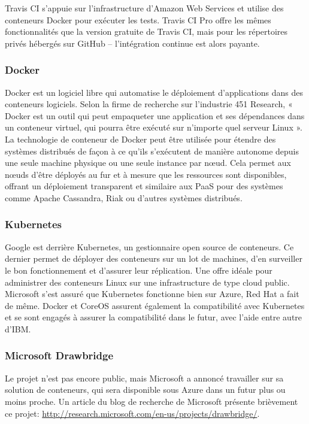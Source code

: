     Travis CI s'appuie sur l'infrastructure d'Amazon Web Services et utilise des conteneurs Docker pour exécuter les tests. Travis CI Pro offre les mêmes fonctionnalités que la version gratuite de Travis CI, mais pour les répertoires privés hébergés sur GitHub -- l'intégration continue est alors payante.

    \subsubsection*{Docker}
    Docker est un logiciel libre qui automatise le déploiement d'applications dans des conteneurs logiciels. Selon la firme de recherche sur l'industrie 451 Research, « Docker est un outil qui peut empaqueter une application et ses dépendances dans un conteneur virtuel, qui pourra être exécuté sur n'importe quel serveur Linux ».\\

    La technologie de conteneur de Docker peut être utilisée pour étendre des systèmes distribués de façon à ce qu'ils s'exécutent de manière autonome depuis une seule machine physique ou une seule instance par nœud. Cela permet aux nœuds d'être déployés au fur et à mesure que les ressources sont disponibles, offrant un déploiement transparent et similaire aux PaaS pour des systèmes comme Apache Cassandra, Riak ou d'autres systèmes distribués.

    \subsubsection*{Kubernetes}
    Google est derrière Kubernetes, un gestionnaire open source de conteneurs. Ce dernier permet de déployer des conteneurs sur un lot de machines, d’en surveiller le bon fonctionnement et d’assurer leur réplication. Une offre idéale pour administrer des conteneurs Linux sur une infrastructure de type cloud public. Microsoft s'est assuré que Kubernetes fonctionne bien sur Azure, Red Hat a fait de même. Docker et CoreOS assurent également la compatibilité avec Kubernetes et se sont engagés à assurer la compatibilité dans le futur, avec l'aide entre autre d'IBM.

    \subsubsection*{Microsoft Drawbridge}
    Le projet n'est pas encore public, mais Microsoft a annoncé travailler sur sa solution de conteneurs, qui sera disponible sous Azure dans un futur plus ou moins proche. Un article du blog de recherche de Microsoft présente brièvement ce projet: \url{http://research.microsoft.com/en-us/projects/drawbridge/}.

